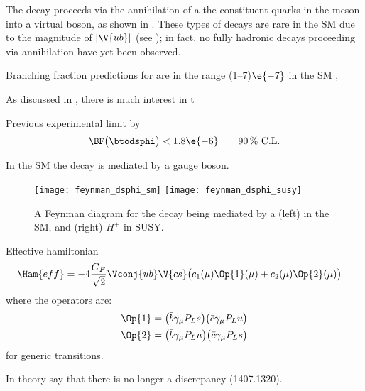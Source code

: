 The decay \btodsphi proceeds via the annihilation of a the constituent quarks in the \Bp meson into
a virtual \Wp boson, as shown in .
These types of decays are rare in the SM due to the magnitude of $|\V{ub}|$ (see );
in fact, no fully hadronic decays proceeding via annihilation have yet been observed.

Branching fraction predictions for \btodsphi are in the range (1--7)$\e{-7}$ in the SM
\cite{Zou:2009zza,Mohanta:2002wf,PhysRevD.76.057701,Lu:2001yz},

As discussed in , there is much interest in t

Previous experimental limit by \babar \cite{Aubert:2005gd}
\begin{equation}
  \BF\big(\btodsphi\big) < 1.8\e{-6} \qquad \text{90\,\% C.L.}
\end{equation}


In the SM the decay is mediated by a \Wp gauge boson.

\begin{figure}
  \begin{center}
    \texttt{[image: feynman\_dsphi\_sm]}
    \texttt{[image: feynman\_dsphi\_susy]}
    \caption[Feynman diagram for the decay \btodsphi]
    {\small
      A Feynman diagram for the decay \btodsphi being mediated by a
      (left) \Wp in the SM, and
      (right) $H^+$ in SUSY.
    }
    \label{fig:dsphi:feyn}
  \end{center}
\end{figure}



Effective hamiltonian
\begin{align}
  \Ham{eff} &= -4\frac{G_F}{\sqrt{2}}\Vconj{ub}\V{cs}
  \big(
  c_1(\mu)\Op{1}(\mu) + c_2(\mu)\Op{2}(\mu)
  \big)
\end{align}
where the operators are:
\begin{align}
  \Op{1} &= \big(\bar b\gamma_\mu P_Ls\big) \big(\bar c\gamma_\mu P_Lu\big) \nonumber\\
  \Op{2} &= \big(\bar b\gamma_\mu P_Lu\big) \big(\bar c\gamma_\mu P_Ls\big)
\end{align}
\cite{Buchalla:1995vs}
for generic  transitions.

























In theory say that there is no longer a discrepancy (1407.1320).
\cite{PDG2012}
